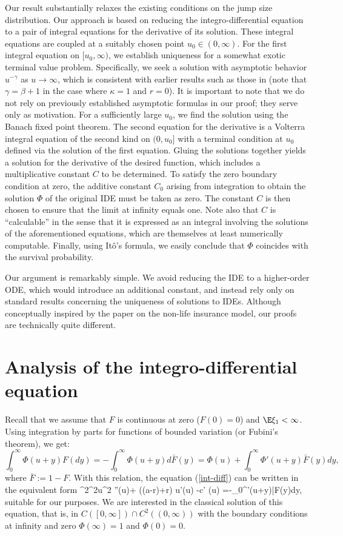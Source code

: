 Our result substantially relaxes the existing conditions on the jump size distribution. Our approach is based on reducing the integro-differential equation to a pair of integral equations for the derivative of its solution. These integral equations are coupled at a suitably chosen point $u_0 \in (0,\infty)$. For the first integral equation on $[u_0,\infty)$, we establish uniqueness for a somewhat exotic terminal value problem. Specifically, we seek a solution with asymptotic behavior $u^{-\gamma}$ as $u \to \infty$, which is consistent with earlier results such as those in \cite{KP2016} (note that $\gamma=\beta+1$ in the case where $\kappa=1$ and $r=0$). It is important to note that we do not rely on previously established asymptotic formulas in our proof; they serve only as motivation. For a sufficiently large $u_0$, we find the solution using the Banach fixed point theorem. The second equation for the derivative is a Volterra integral equation of the second kind on $(0, u_0]$ with a terminal condition at $u_0$ defined via the solution of the first equation. Gluing the solutions together yields a solution for the derivative of the desired function, which includes a multiplicative constant $C$ to be determined. To satisfy the zero boundary condition at zero, the additive constant $C_0$ arising from integration to obtain the solution $\Phi$ of the original IDE must be taken as zero. The constant $C$ is then chosen to ensure that the limit at infinity equals one. Note also that $C$ is ``calculable'' in the sense that it is expressed as an integral involving the solutions of the aforementioned equations, which are themselves at least numerically computable. Finally, using It\^o's formula, we easily conclude that $\Phi$ coincides with the survival probability.

Our argument is remarkably simple. We avoid reducing the IDE to a higher-order ODE, which would introduce an additional constant, and instead rely only on standard results concerning the uniqueness of solutions to IDEs. Although conceptually inspired by the paper \cite{Grandits2004} on the non-life insurance model, our proofs are technically quite different.

\section{Analysis of the integro-differential equation} 
Recall that we assume that $F$ is continuous at zero ($F(0)=0$) and $\E \xi_1 <\infty$. 
Using integration by parts for functions of bounded variation (or Fubini's theorem), we get:
$$
\int_0^\infty \Phi(u+y) F(dy) = -\int_0^\infty \Phi(u+y) d\bar{F}(y) = \Phi(u) + \int_0^\infty \Phi'(u+y)\bar F(y)dy,
$$
where $\bar F:=1-F$. With this relation, the equation (\ref{int-diff}) can be written in the equivalent form 
\beq
\label{IDE-F}
 \kappa^2\sigma^2u^2 \Phi''(u)+ ((a-r)\kappa +r) u\Phi'(u) -c\Phi' (u) 
=-\lambda \int_0^\infty\Phi'(u+y)\bar F(y)dy,
\eeq
suitable for our purposes. We are interested in the classical solution of this equation, that is, in $C([0,\infty])\cap C^2((0,\infty))$ with the boundary conditions at infinity and zero $\Phi(\infty)=1$ and $\Phi (0)=0$. 

